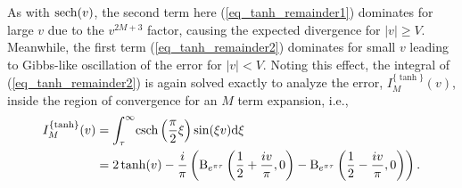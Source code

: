 As with $\operatorname{sech}(v)$, the second term here (\ref{eq_tanh_remainder1}) dominates for
large $v$ due to the $v^{2M+3}$ factor, causing the expected divergence
for $|v| \geq V$.  Meanwhile, the first term (\ref{eq_tanh_remainder2})
dominates for small $v$ leading to Gibbs-like oscillation of the
error for $|v| < V$.  Noting this effect, the integral of
(\ref{eq_tanh_remainder2}) is again solved exactly to analyze the
error, $I_M^{\{\tanh\}}(v)$, inside the region of convergence for an
$M$ term expansion, i.e.,
\begin{gather}
	\begin{split}
		\label{eq_beta_fn_error_part}
		I_M^{\{\tanh\}}(v) &= \int_\tau^{\infty} \!
		\operatorname{csch}\left(\frac{\pi}{2}\xi\right)
		\sin(\xi v) \mathrm{d}\xi \\
		&= 2 \tanh(v) - \frac{i}{\pi}\left(
		\mathrm{B}_{e^{\pi \tau}}\left(\frac{1}{2} + \frac{iv}{\pi}, 0 \right)
		- \mathrm{B}_{e^{\pi \tau}}\left(\frac{1}{2} - \frac{iv}{\pi}, 0 \right)\right). \\
	\end{split}
\end{gather}

